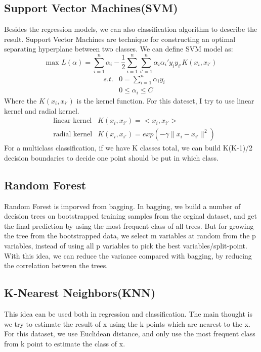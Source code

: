 \documentclass[11pt]{article}
\begin{document}
\subsection{Support Vector Machines(SVM)}  
Besides the regression models, we can also classification algorithm to describe the result. Support Vector Machines are technique for constructing an optimal separating hyperplane between two classes. We can define SVM model as:$$\text{max }L(\alpha)=\sum_{i=1}^{n} \alpha_i - \frac{1}{2}\sum_{i=1}^{n}\sum_{i'=1}^{n}\alpha_i \alpha_i' y_i y_{i'} K(x_i,x_{i'})$$
    \begin{align}
        &s.t.  &0=\sum_{i=1}^{n} \alpha_iy_i \nonumber \\
        &      &0 \leq \alpha_i \leq C \nonumber
    \end{align}
Where the $K(x_i,x_{i'})$ is the kernel function. For this dateset, I try to use linear kernel and radial kernel.
    \begin{align}
        &\text{linear kernel}  &K(x_i,x_{i'})=<x_i,x_{i'}> \nonumber \\
        &\text{radial kernel}  &K(x_i,x_{i'})=exp(-\gamma \lVert x_i-x_{i'} \rVert^2) \nonumber
    \end{align}
For a multiclass classification, if we have K classes total, we can build K(K-1)/2 decision boundaries to decide one point should be put in which class.

\subsection{Random Forest} 
Random Forest is imporved from bagging. In bagging, we build a number of decision trees on bootstrapped training samples from the orginal dataset, and get the final prediction by using the most frequent class of all trees. But for growing the tree from the bootstrapped data, we select m variables at random from the p variables, instead of using all p variables to pick the best variables/split-point. With this idea, we can reduce the variance compared with bagging, by reducing the correlation between the trees.

\subsection{K-Nearest Neighbors(KNN)} 
This idea can be used both in regression and classification. The main thought is we try to estimate the result of x using the k points which are nearest to the x. For this dataset, we use Euclidean distance, and only use the most frequent class from k point to estimate the class of x.
\end{document}

